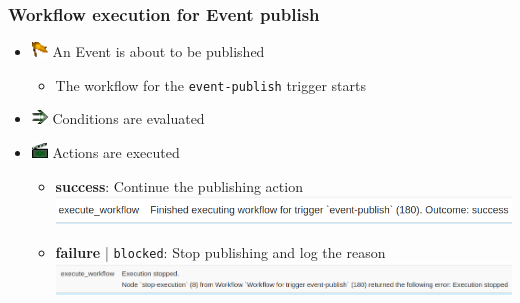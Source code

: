 \begin{frame}
    \frametitle{Workflow execution for Event publish}
    \begin{itemize}
        \setlength\itemsep{1em}
        \item[] \hspace*{-2em}\includegraphics[width=16px]{pictures/sc-event-icon.png} \hspace*{0.25em} An Event is about to be published
        \begin{itemize}
            \item The workflow for the \texttt{event-publish} trigger starts
        \end{itemize}
        \item[] \hspace*{-2em}\includegraphics[width=16px]{pictures/sc-condition-icon.png} \hspace*{0.25em} Conditions are evaluated
        \item[] \hspace*{-2em}\includegraphics[width=16px]{pictures/sc-action-icon.png} \hspace*{0.25em} Actions are executed
        \begin{itemize}
            \setlength\itemsep{0.75em}
            \item {\bf\color{green!50!black}success}: Continue the publishing action
            \hspace*{-4em}\includegraphics[width=1.0\textwidth]{pictures/log-entry-publish-success.png}
            \item {\bf\color{red}failure} | \texttt{\color{red}blocked}: Stop publishing and log the reason
            \hspace*{-4em}\includegraphics[width=1.0\textwidth]{pictures/log-entry-publish-blocked.png}
        \end{itemize}
    \end{itemize}
\end{frame}

